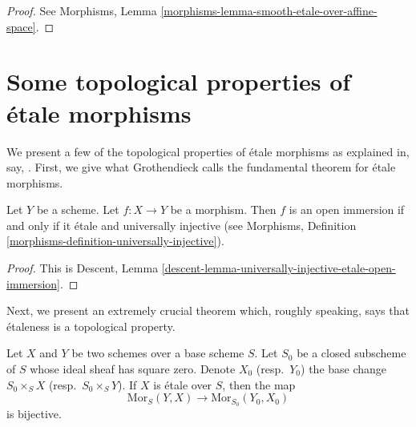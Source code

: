 \begin{proof}
See
Morphisms, Lemma \ref{morphisms-lemma-smooth-etale-over-affine-space}.
\end{proof}




\section{Some topological properties of \'etale morphisms}
\label{section-topological-etale}

\noindent
We present a few of the topological properties of \'etale
morphisms as explained in, say, \cite[Expos\'e I.5]{SGA1}.
First, we give what Grothendieck
calls the fundamental theorem for \'etale morphisms.

\begin{theorem}
\label{theorem-etale-radiciel-open}
Let $Y$ be a scheme.
Let $f : X \to Y$ be a morphism.
Then $f$ is an open immersion if and only if it \'etale and
universally injective (see
Morphisms, Definition \ref{morphisms-definition-universally-injective}).
\end{theorem}

\begin{proof}
This is Descent,
Lemma \ref{descent-lemma-universally-injective-etale-open-immersion}.
\end{proof}

\noindent
Next, we present an extremely crucial theorem which, roughly speaking, says
that \'etaleness is a topological property.

\begin{theorem}
\label{theorem-etale-topological}
Let $X$ and $Y$ be two schemes over a base scheme $S$.
Let $S_0$ be a closed subscheme of $S$ whose ideal sheaf has square zero.
Denote $X_0$ (resp.\ $Y_0$) the base change $S_0 \times_S X$
(resp.\ $S_0 \times_S Y$).
If $X$ is \'etale over $S$, then the map
$$
\text{Mor}_S(Y, X) \longrightarrow \text{Mor}_{S_0}(Y_0, X_0)
$$
is bijective.
\end{theorem}


